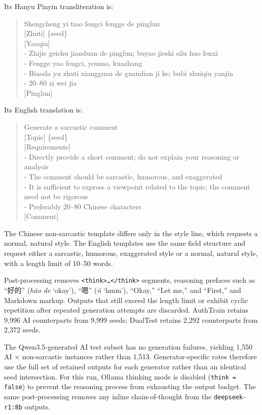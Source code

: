 Its Hanyu Pinyin transliteration is:

\begin{quote}\small\ttfamily
[Renwu] Shengcheng yi tiao fengci fengge de pinglun\\
{[Zhuti]} \{seed\}\\
{[Yaoqiu]}\\
- Zhijie geichu jianduan de pinglun; buyao jieshi silu huo fenxi\\
- Fengge yao fengci, youmo, kuazhang\\
- Biaoda yu zhuti xiangguan de guandian ji ke; bubi zhuiqiu yanjin\\
- 20--80 zi wei jia\\
{[Pinglun]}
\end{quote}

Its English translation is:

\begin{quote}\small\ttfamily
[Task] Generate a sarcastic comment\\
{[Topic]} \{seed\}\\
{[Requirements]}\\
- Directly provide a short comment; do not explain your reasoning or analysis\\
- The comment should be sarcastic, humorous, and exaggerated\\
- It is sufficient to express a viewpoint related to the topic; the comment need not be rigorous\\
- Preferably 20--80 Chinese characters\\
{[Comment]}
\end{quote}

The Chinese non-sarcastic template differs only in the style line, which requests a normal, natural style. The English templates use the same field structure and request either a sarcastic, humorous, exaggerated style or a normal, natural style, with a length limit of 10--50 words.

Post-processing removes \texttt{<think>\dots</think>} segments, reasoning prefaces such as ``好的'' (\textit{hǎo de} `okay'), ``嗯'' (\textit{ń} `hmm'), ``Okay,'' ``Let me,'' and ``First,'' and Markdown markup. Outputs that still exceed the length limit or exhibit cyclic repetition after repeated generation attempts are discarded. AuthTrain retains 9{,}996 AI counterparts from 9{,}999 seeds; DualTest retains 2{,}292 counterparts from 2{,}372 seeds.

The Qwen3.5-generated AI test subset has no generation failures, yielding 1{,}550 AI $\times$ non-sarcastic instances rather than 1{,}513. Generator-specific rates therefore use the full set of retained outputs for each generator rather than an identical seed intersection. For this run, Ollama thinking mode is disabled (\texttt{think = false}) to prevent the reasoning process from exhausting the output budget. The same post-processing removes any inline chain-of-thought from the \texttt{deepseek-r1:8b} outputs.

